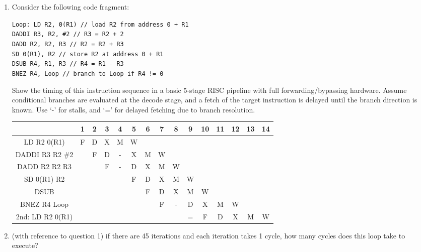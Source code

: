 \documentclass[12pt]{article}
\begin{document}
    \begin{enumerate}
        \item Consider the following code fragment:
        
        \texttt{Loop: LD R2, 0(R1)   // load R2 from address 0 + R1}\\
        \texttt{DADDI R3, R2, \#2    // R3 = R2 + 2}\\
        \texttt{DADD R2, R2, R3      // R2 = R2 + R3}\\
        \texttt{SD 0(R1), R2         // store R2 at address 0 + R1}\\
        \texttt{DSUB R4, R1, R3      // R4 = R1 - R3}\\
        \texttt{BNEZ R4, Loop        // branch to Loop if R4 != 0}

        Show the timing of this instruction sequence in a basic 5-stage RISC pipeline with full forwarding/bypassing 
        hardware. Assume conditional branches are evaluated at the decode stage, and a fetch of the target instruction 
        is delayed until the branch direction is known. Use `-' for stalls, and `=' for delayed fetching due to branch 
        resolution.
        
        \begin{tabular}[ht!]{|c|c|c|c|c|c|c|c|c|c|c|c|c|c|c|} \hline
                             & 1 & 2 & 3 & 4 & 5 & 6 & 7 & 8 & 9 & 10 & 11 & 12 & 13 & 14 \\\hline
            LD R2 0(R1)      & F & D & X & M & W &   &   &   &   &    &    &    &    &    \\\hline
            DADDI R3 R2 \#2  &   & F & D & - & X & M & W &   &   &    &    &    &    &    \\\hline
            DADD R2 R2 R3    &   &   & F & - & D & X & M & W &   &    &    &    &    &    \\\hline
            SD 0(R1) R2      &   &   &   &   & F & D & X & M & W &    &    &    &    &    \\\hline
            DSUB             &   &   &   &   &   & F & D & X & M & W  &    &    &    &    \\\hline
            BNEZ R4 Loop     &   &   &   &   &   &   & F & - & D & X  & M  & W  &    &    \\\hline
            2nd: LD R2 0(R1) &   &   &   &   &   &   &   &   & = & F  & D  & X  & M  & W  \\\hline
        \end{tabular}

        \item (with reference to question 1) if there are 45 iterations and each iteration takes 1 cycle, how many cycles 
        does this loop take to execute?


\end{enumerate}
\end{document}
